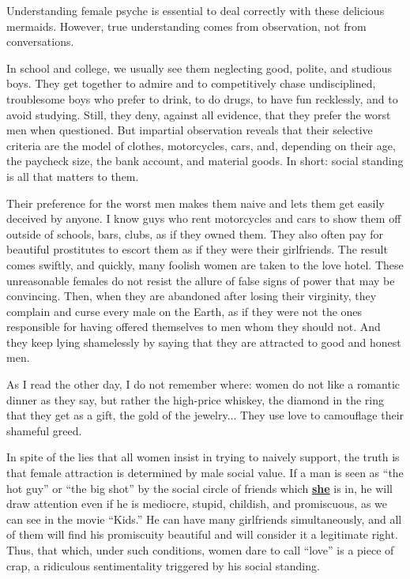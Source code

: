 \par Understanding female psyche is essential to deal correctly with these delicious mermaids. However, true understanding comes from observation, not from conversations.

\par In school and college, we usually see them neglecting good, polite, and studious boys. They get together to admire and to competitively chase undisciplined, troublesome boys who prefer to drink, to do drugs, to have fun recklessly, and to avoid studying. Still, they deny, against all evidence, that they prefer the worst men when questioned. But impartial observation reveals that their selective criteria are the model of clothes, motorcycles, cars, and, depending on their age, the paycheck size, the bank account, and material goods. In short: social standing is all that matters to them.

\par Their preference for the worst men makes them naive and lets them get easily deceived by anyone. I know guys who rent motorcycles and cars to show them off outside of schools, bars, clubs, as if they owned them. They also often pay for beautiful prostitutes to escort them as if they were their girlfriends. The result comes swiftly, and quickly, many foolish women are taken to the love hotel. These unreasonable females do not resist the allure of false signs of power that may be convincing. Then, when they are abandoned after losing their virginity, they complain and curse every male on the Earth, as if they were not the ones responsible for having offered themselves to men whom they should not. And they keep lying shamelessly by saying that they are attracted to good and honest men.

\par As I read the other day, I do not remember where: women do not like a romantic dinner as they say, but rather the high-price whiskey, the diamond in the ring that they get as a gift, the gold of the jewelry... They use love to camouflage their shameful greed.

\par In spite of the lies that all women insist in trying to naively support, the truth is that female attraction is determined by male social value. If a man is seen as \enquote{the hot guy} or \enquote{the big shot} by the social circle of friends which \textbf{\underline{she}} is in, he will draw attention even if he is mediocre, stupid, childish, and promiscuous, as we can see in the movie \enquote{Kids.} He can have many girlfriends simultaneously, and all of them will find his promiscuity beautiful and will consider it a legitimate right. Thus, that which, under such conditions, women dare to call \enquote{love} is a piece of crap, a ridiculous sentimentality triggered by his social standing.

